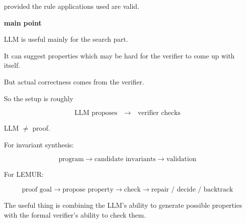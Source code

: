 \documentclass[11pt]{article}
\begin{document}
provided the rule applications used are valid.

\vspace{7pt}

\textbf{main point}

LLM is useful mainly for the search part.

It can suggest properties which may be hard for
the verifier to come up with itself.

But actual correctness comes from the verifier.

So the setup is roughly

\[
\boxed{
\text{LLM proposes}
\quad\rightarrow\quad
\text{verifier checks}
}
\]

LLM $\neq$ proof.

\vspace{7pt}

For invariant synthesis:

\[
\text{program}
\rightarrow
\text{candidate invariants}
\rightarrow
\text{validation}
\]

For LEMUR:

\[
\text{proof goal}
\rightarrow
\text{propose property}
\rightarrow
\text{check}
\rightarrow
\text{repair / decide / backtrack}
\]

The useful thing is combining the LLM's ability to
generate possible properties with the formal verifier's
ability to check them.
\end{document}
